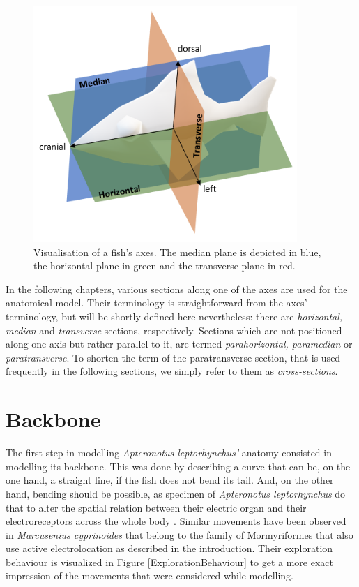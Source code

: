 \begin{figure}
   \centering
   \includegraphics[width=10cm]{figures/Axes.PNG}
   \caption{Visualisation of a fish's axes. The median plane is depicted in blue, the horizontal plane in green and the transverse plane in red.}
   \label{fig:Axes}
\end{figure}

In the following chapters, various sections along one of the axes are used for the anatomical model. Their terminology is straightforward from the axes' terminology, but will be shortly defined here nevertheless: there are \textit{horizontal, median} and \textit{transverse} sections, respectively. Sections which are not positioned along one axis but rather parallel to it, are termed \textit{parahorizontal, paramedian} or \textit{paratransverse}. To shorten the term of the paratransverse section, that is used frequently in the following sections, we simply refer to them as \textit{cross-sections}.

\section{Backbone}
    \label{BackboneModelling}
    
The first step in modelling \textit{Apteronotus leptorhynchus'} anatomy consisted in modelling its backbone. This was done by describing a curve that can be, on the one hand, a straight line, if the fish does not bend its tail. And, on the other hand, bending should be possible, as specimen of \textit{Apteronotus leptorhynchus} do that to alter the spatial relation between their electric organ and their electroreceptors across the whole body \cite{bell1997generation}. Similar movements have been observed in \textit{Marcusenius cyprinoides} that belong to the family of Mormyriformes that also use active electrolocation as described in the introduction. Their exploration behaviour is visualized in Figure
\ref{ExplorationBehaviour} to get a more exact impression of the movements that were considered while modelling.

